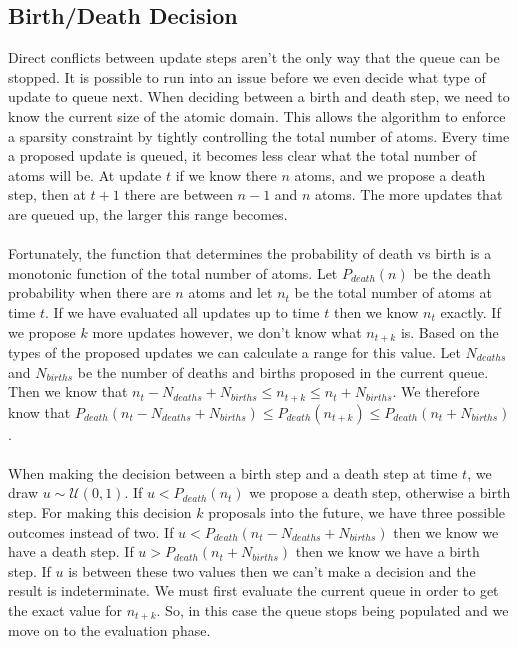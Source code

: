 \documentclass[]{article}
\begin{document}
\subsection{Birth/Death Decision}

Direct conflicts between update steps aren't the only way that the queue can be stopped. It is possible to run into an issue before we even decide what type of update to queue next. When deciding between a birth and death step, we need to know the current size of the atomic domain. This allows the algorithm to enforce a sparsity constraint by tightly controlling the total number of atoms. Every time a proposed update is queued, it becomes less clear what the total number of atoms will be. At update $t$ if we know there $n$ atoms, and we propose a death step, then at $t+1$ there are between $n-1$ and $n$ atoms. The more updates that are queued up, the larger this range becomes.\\
\\
Fortunately, the function that determines the probability of death vs birth is a monotonic function of the total number of atoms. Let $P_{death}(n)$ be the death probability when there are $n$ atoms and let $n_t$ be the total number of atoms at time $t$. If we have evaluated all updates up to time $t$ then we know $n_t$ exactly. If we propose $k$ more updates however, we don't know what $n_{t+k}$ is. Based on the types of the proposed updates we can calculate a range for this value. Let $N_{deaths}$ and $N_{births}$ be the number of deaths and births proposed in the current queue. Then we know that $n_t - N_{deaths} + N_{births} \leq n_{t+k} \leq n_t + N_{births}$. We therefore know that $P_{death}(n_t - N_{deaths} + N_{births}) \leq P_{death}(n_{t+k}) \leq P_{death}(n_t + N_{births})$.\\
\\
When making the decision between a birth step and a death step at time $t$, we draw $u \sim \mathcal{U}(0,1)$. If $u < P_{death}(n_t)$ we propose a death step, otherwise a birth step. For making this decision $k$ proposals into the future, we have three possible outcomes instead of two. If $u < P_{death}(n_t - N_{deaths} + N_{births})$ then we know we have a death step. If $u > P_{death}(n_t + N_{births})$ then we know we have a birth step. If $u$ is between these two values then we can't make a decision and the result is indeterminate. We must first evaluate the current queue in order to get the exact value for $n_{t+k}$. So, in this case the queue stops being populated and we move on to the evaluation phase.
\end{document}
